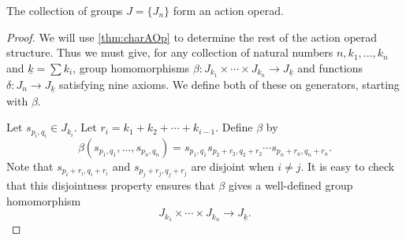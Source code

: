 \documentclass{amsbook} %
\numberwithin{section}{chapter}
\begin{document}
\begin{thm}\label{J_aop}
The collection of groups $J = \{ J_{n} \}$ form an action operad.
\end{thm}
\begin{proof}
We will use \cref{thm:charAOp} to determine the rest of the action operad structure.  Thus we must give, for any collection of natural numbers $n, k_{1}, \ldots, k_{n}$ and $\underline{k} = \sum k_{i}$, group homomorphisms $\beta:J_{k_{1}} \times \cdots \times J_{k_{n}} \rightarrow J_{\underline{k}}$ and functions $\delta: J_{n} \rightarrow J_{\underline{k}}$ satisfying nine axioms.    We define both of these on generators, starting with $\beta$.

Let $s_{p_{i}, q_{i}} \in J_{k_{i}}$.  Let $r_{i} = k_{1} + k_{2} + \cdots + k_{i-1}$.  Define $\beta$ by
\[
\beta(s_{p_{1}, q_{1}}, \ldots, s_{p_{n}, q_{n}}) = s_{p_{1}, q_{1}} s_{p_{2}+r_{2}, q_{2}+r_{2}} \cdots s_{p_{n}+r_{n}, q_{n}+r_{n}}.
\]
Note that $s_{p_{i}+r_{i}, q_{i}+r_{i}}$ and $s_{p_{j}+r_{j}, q_{j}+r_{j}}$ are disjoint when $i \neq j$.
%
It is easy to check that this disjointness property ensures that $\beta$ gives a well-defined group homomorphism
\[
J_{k_{1}} \times \cdots \times J_{k_{n}} \rightarrow J_{\underline{k}}.
\]


\end{proof}
\end{document}
